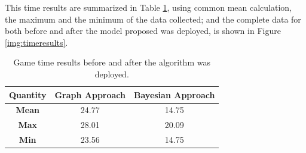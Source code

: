 This time results are summarized in Table \ref{tab:timeresults}, using common mean calculation, the maximum and the minimum of the data collected; and the complete data for both before and after the model proposed was deployed, is shown in Figure \ref{img:timeresults}.
\begin{table}[H]
\centering
\caption{Game time results before and after the algorithm was deployed.}
\label{tab:timeresults}
\begin{tabular}{ccc}
\hline
\textbf{Quantity} & \textbf{Graph Approach} & \textbf{Bayesian Approach} \\ \hline
\textbf{Mean}     & 24.77                   & 14.75                      \\
\textbf{Max}      & 28.01                   & 20.09                      \\
\textbf{Min}      & 23.56                   & 14.75                     \\ \hline
\end{tabular}
\end{table}
